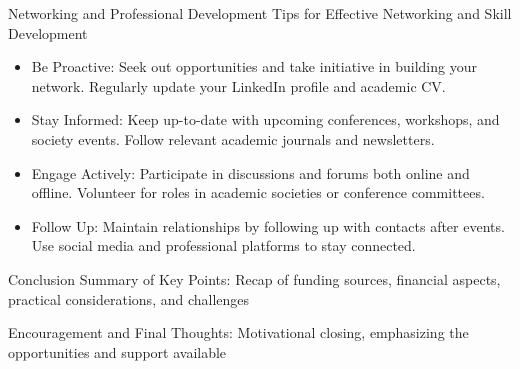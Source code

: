 \documentclass[10pt]{beamer}
\begin{document}
\begin{frame}[fragile]{Networking and Professional Development}
\alert{Tips for Effective Networking and Skill Development}
	\begin{itemize}
		\item Be Proactive: Seek out opportunities and take initiative in building your network. Regularly update your LinkedIn profile and academic CV.
		\item Stay Informed: Keep up-to-date with upcoming conferences, workshops, and society events. Follow relevant academic journals and newsletters.
		\item Engage Actively: Participate in discussions and forums both online and offline. Volunteer for roles in academic societies or conference committees.
		\item Follow Up: Maintain relationships by following up with contacts after events.
Use social media and professional platforms to stay connected.

	
	\end{itemize}
\end{frame}

\begin{frame}[fragile]{Conclusion}
	Summary of Key Points:
Recap of funding sources, financial aspects, practical considerations, and challenges

	Encouragement and Final Thoughts:
Motivational closing, emphasizing the opportunities and support available
\end{frame}
\end{document}
